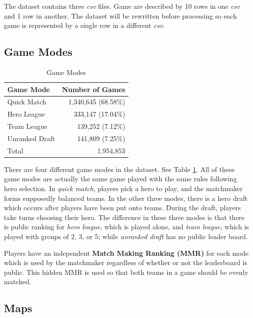 \documentclass[twoside,twocolumn]{article}
\begin{document}
The dataset contains three \textit{csv} files.  Game are described by 10 rows in one \textit{csv} and 1 row in another.  The dataset will be rewritten before processing so each game is represented by a single row in a different \textit{csv}.

\subsection{Game Modes}

\begin{table}[h]
\caption{Game Modes}
\label{table:modes}
\centering
\begin{tabular}{lr}
\toprule
Game Mode & Number of Games \\
\midrule
Quick Match & 1,340,645  (68.58\%) \\
Hero League  & 333,147  (17.04\%) \\
Team League & 139,252  (7.12\%) \\
Unranked Draft & 141,809  (7.25\%) \\
\midrule
Total & 1,954,853 \\
\bottomrule
\end{tabular}
\end{table}

There are four different game modes in the dataset. See Table \ref{table:modes}.  All of these game modes are actually the same game played with the same rules following hero selection.  In \textit{quick match}, players pick a hero to play, and the matchmaker forms supposedly balanced teams.  In the other three modes, there is a hero draft which occurs after players have been put onto teams.  During the draft, players take turns choosing their hero.  The difference in these three modes is that there is public ranking for \textit{hero league}, which is played alone, and \textit{team league}, which is played with groups of 2, 3, or 5; while \textit{unranked draft} has no public leader board.

Players have an independent \textbf{Match Making Ranking (MMR)} for each mode which is used by the matchmaker regardless of whether or not the leaderboard is public.  This hidden MMR is used so that both teams in a game should be evenly matched.

\subsection{Maps}
\end{document}
